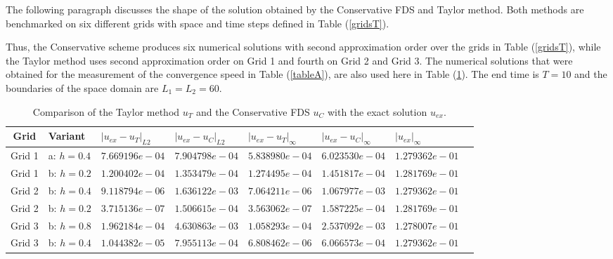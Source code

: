 \documentclass[%
 aip,
cp,  
 amsmath,amssymb,
 reprint,
]{iopconfser}
\newcommand{\rf}[1]{(\ref{#1})}
\begin{document}
The following paragraph discusses the shape of the solution obtained by the Conservative FDS and Taylor method. Both methods are benchmarked on six different grids with space and time steps defined in Table \rf{gridsT}.

Thus, the Conservative scheme produces six numerical solutions with second approximation order over the grids in Table \rf{gridsT}, while the Taylor method uses second approximation order on Grid 1 and fourth on Grid 2 and Grid 3. The numerical solutions that were obtained for the measurement of the convergence speed in Table \rf{tableA}, are also used here in Table \rf{compareTable}. The end time is $T=10$ and the boundaries of the space domain are $L_1 = L_2 = 60$.

\begin{table}[ht]
\centering
\small
		\begin{tabular}{|c|l|l|l|l|l|l|l|}
			\hline
           Grid                    & Variant   &    $|u_{ex}-u_{T}|_{L2}$  &    $|u_{ex}-u_{C}|_{L2}$  &   $|u_{ex}-u_T|_{\infty}$ &   $|u_{ex}-u_C|_{\infty}$   &  $|u_{ex}|_{\infty}$      \\
			\hline
           Grid 1          &     a:  $h=0.4$  &  $ 7.669196e-04$       &     $7.904798e-04$               &     $5.838980e-04$           &               $6.023530e-04$     &       $1.279362e-01$ \\
			\hline
           Grid 1          &     b:  $h=0.2$  &  $ 1.200402e-04$       &     $1.353479e-04$               &     $1.274495e-04$           &               $1.451817e-04$     &       $1.281769e-01$ \\
			\hline
           Grid 2          &     b:  $h=0.4$  &  $ 9.118794e-06$       &     $1.636122e-03$               &     $7.064211e-06$           &               $1.067977e-03$     &       $1.279362e-01$ \\
			\hline
           Grid 2          &     b:  $h=0.2$  &  $ 3.715136e-07$       &     $ 1.506615e-04$               &     $3.563062e-07$           &               $1.587225e-04$     &       $1.281769e-01$ \\
			\hline
           Grid 3          &     b:  $h=0.8$  &  $ 1.962184e-04$       &     $ 4.630863e-03$               &     $1.058293e-04$           &               $2.537092e-03$     &       $1.278007e-01$ \\
			\hline
           Grid 3          &     b:  $h=0.4$  &  $ 1.044382e-05$       &     $  7.955113e-04$               &     $ 6.808462e-06$           &               $6.066573e-04$     &       $1.279362e-01$ \\
			\hline
		\end{tabular}
	\caption{ Comparison of the Taylor method  $u_{T}$ and the Conservative FDS $u_{C}$ with the exact solution $u_{ex}$.}
	\label{compareTable}
\end{table}
\end{document}
